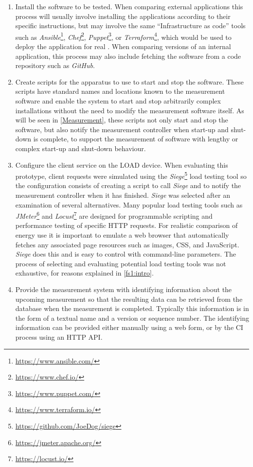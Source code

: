 \begin{enumerate}

\item  Install the software to be tested. When comparing external applications this process will usually involve installing the applications according to their specific instructions, but may involve the same \enquote{Infrastructure as code} tools such as \emph{Ansible}\footnote{\url{https://www.ansible.com/}}, \emph{Chef}\footnote{\url{https://www.chef.io/}}, \emph{Puppet}\footnote{\url{https://www.puppet.com/}}, or \emph{Terraform}\footnote{\url{https://www.terraform.io/}}, which would be used to deploy the application for real \citep{Rahman2019}. When comparing versions of an internal application, this process may also include fetching the software from a code repository such as \emph{GitHub}.

\item Create scripts for the apparatus to use to start and stop the software. These scripts have standard names and locations known to the measurement software and enable the system to start and stop arbitrarily complex installations without the need to modify the measurement software itself. As will be seen in \autoref{Measurement}, these scripts not only start and stop the software, but also notify the measurement controller when start-up and shut-down is complete, to support the measurement of software with lengthy or complex start-up and shut-down behaviour.

\item Configure the client service on the LOAD device. When evaluating this prototype, client requests were simulated using the \emph{Siege}\footnote{\url{https://github.com/JoeDog/siege}} load testing tool so the configuration consists of creating a script to call \emph{Siege} and to notify the measurement controller when it has finished. \emph{Siege} was selected after an examination of several alternatives. Many popular load testing tools such as \emph{JMeter}\footnote{\url{https://jmeter.apache.org/}} and \emph{Locust}\footnote{\url{https://locust.io/}} are designed for programmable scripting and performance testing of specific HTTP requests. For realistic comparison of energy use it is important to emulate a web browser that automatically fetches any associated page resources such as images, CSS, and JavaScript. \emph{Siege} does this and is easy to control with command-line parameters. The process of selecting and evaluating potential load testing tools was not exhaustive, for reasons explained in \autoref{fs1:intro}.

\item Provide the measurement system with identifying information about the upcoming measurement so that the resulting data can be retrieved from the database when the measurement is completed. Typically this information is in the form of a textual name and a version or sequence number. The identifying information can be provided either manually using a web form, or by the CI process using an HTTP API.

\end{enumerate}

